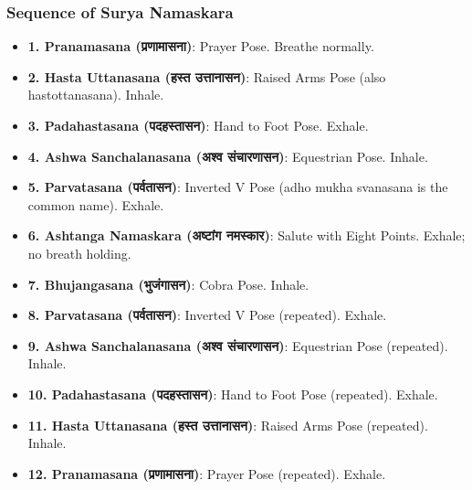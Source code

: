 \begin{frame}[fragile]\frametitle{Sequence of Surya Namaskara}

      \begin{itemize}
        \item \textbf{1. Pranamasana (प्रणामासना)}: Prayer Pose. Breathe normally.
        \item \textbf{2. Hasta Uttanasana (हस्त उत्तानासन)}: Raised Arms Pose (also hastottanasana). Inhale.
        \item \textbf{3. Padahastasana (पदहस्तासन)}: Hand to Foot Pose. Exhale.
        \item \textbf{4. Ashwa Sanchalanasana (अश्व संचारणासन)}: Equestrian Pose. Inhale.
        \item \textbf{5. Parvatasana (पर्वतासन)}: Inverted V Pose (adho mukha svanasana is the common name). Exhale.
        \item \textbf{6. Ashtanga Namaskara (अष्टांग नमस्कार)}: Salute with Eight Points. Exhale; no breath holding.
        \item \textbf{7. Bhujangasana (भुजंगासन)}: Cobra Pose. Inhale.
        \item \textbf{8. Parvatasana (पर्वतासन)}: Inverted V Pose (repeated). Exhale.
        \item \textbf{9. Ashwa Sanchalanasana (अश्व संचारणासन)}: Equestrian Pose (repeated). Inhale.
        \item \textbf{10. Padahastasana (पदहस्तासन)}: Hand to Foot Pose (repeated). Exhale.
        \item \textbf{11. Hasta Uttanasana (हस्त उत्तानासन)}: Raised Arms Pose (repeated). Inhale.
        \item \textbf{12. Pranamasana (प्रणामासना)}: Prayer Pose (repeated). Exhale.
      \end{itemize}
 
\end{frame}


